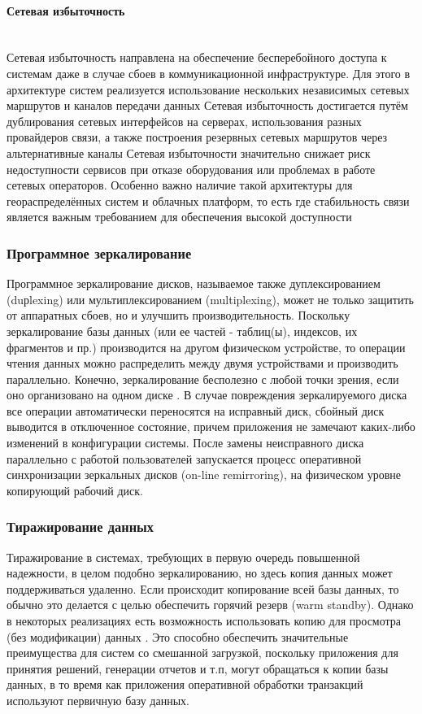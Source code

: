 \paragraph{Сетевая избыточность} ~\\
Сетевая избыточность направлена на обеспечение бесперебойного доступа к системам даже в случае сбоев в коммуникационной инфраструктуре. Для этого в архитектуре систем реализуется использование нескольких независимых сетевых маршрутов и каналов передачи данных %
Сетевая избыточность достигается путём дублирования сетевых интерфейсов на серверах, использования разных провайдеров связи, а также построения резервных сетевых маршрутов через альтернативные каналы %
Сетевая избыточности значительно снижает риск недоступности сервисов при отказе оборудования или проблемах в работе сетевых операторов. Особенно важно наличие такой архитектуры для геораспределённых систем и облачных платформ, то есть где стабильность связи является важным требованием для обеспечения высокой доступности %

\subsubsection{Программное зеркалирование} 

Программное зеркалирование дисков, называемое также дуплексированием (duрlexing) или мультиплексированием (multiplexing), может не только защитить от аппаратных сбоев, но и улучшить производительность. Поскольку зеркалирование базы данных (или ее частей - таблиц(ы), индексов, их фрагментов и пр.) производится на другом физическом устройстве, то операции чтения данных можно распределить между двумя устройствами и производить параллельно. Конечно, зеркалирование бесполезно с любой точки зрения, если оно организовано на одном диске \autocite{Baron}.
В случае повреждения зеркалируемого диска все операции автоматически переносятся на исправный диск, сбойный диск выводится в отключенное состояние, причем приложения не замечают каких-либо изменений в конфигурации системы.
После замены неисправного диска параллельно с работой пользователей запускается процесс оперативной синхронизации зеркальных дисков (on-line remirroring), на физическом уровне копирующий рабочий диск. \\

\subsubsection{Тиражирование данных}
Тиражирование в системах, требующих в первую очередь повышенной надежности, в целом подобно зеркалированию, но здесь копия данных может поддерживаться удаленно. Если происходит копирование всей базы данных, то обычно это делается с целью обеспечить горячий резерв (warm standby). Однако в некоторых реализациях есть возможность использовать копию для просмотра (без модификации) данных \autocite{Baron}. Это способно обеспечить значительные преимущества для систем со смешанной загрузкой, поскольку приложения для принятия решений, генерации отчетов и т.п, могут обращаться к копии базы данных, в то время как приложения оперативной обработки транзакций используют первичную базу данных.


